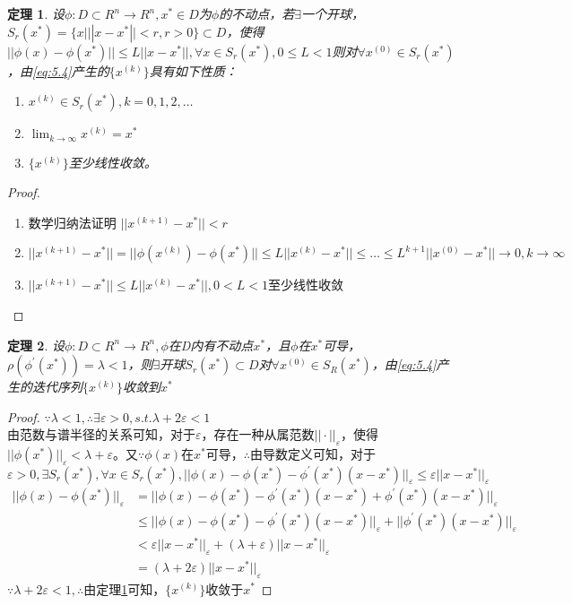 \documentclass[a4paper]{article}
\newtheorem{theorem}{定理}[section]
\begin{document}
\begin{theorem}
    \label{theorem:5.3}
    设$\phi:D\subset R^n \rightarrow R^n, x^*\in D$为$\phi$的不动点，若$\exists$一个开球，$S_r(x^*)=\{x|||x-x^*||<r, r>0\}\subset D $，使得
    $||\phi(x)-\phi(x^*) ||\le L||x-x^*||,\forall x\in S_r(x^*), 0\le L<1 $则对$\forall x^{(0)}\in S_r(x^*) $，由\ref{eq:5.4}产生的$\{x^{(k)} \}$具有如下性质：
    \begin{enumerate}
        \item $x^{(k)}\in S_r(x^*), k=0,1,2,\dots $
        \item $\lim_{k\rightarrow\infty}x^{(k)}=x^* $
        \item $\{x^{(k)} \}$至少线性收敛。
    \end{enumerate}
\end{theorem}
\begin{proof}
    \begin{enumerate}
        \item 数学归纳法证明 $||x^{(k+1)}-x^* ||<r$
        \item $||x^{(k+1)}-x^* ||=||\phi(x^{(k)})-\phi(x^*) ||\le L||x^{(k)}-x^*||\le \dots \le L^{k+1}||x^{(0)}-x^* || \rightarrow 0, k\rightarrow\infty$
        \item $||x^{(k+1)}-x^* ||\le L||x^{(k)}-x^*||, 0<L<1$至少线性收敛
    \end{enumerate}
\end{proof}

\begin{theorem}
    设$\phi:D\subset R^n \rightarrow R^n, \phi$在D内有不动点$x^*$，且$\phi$在$x^*$可导，$\rho(\phi^{'}(x^*))=\lambda <1$，则$\exists$开球$S_r(x^*)\subset D$对$\forall x^{(0)}\in S_R(x^*) $，由\ref{eq:5.4}产生的迭代序列$\{x^{(k)} \}$收敛到$x^*$
\end{theorem}
\begin{proof}
    $\because \lambda<1, \therefore \exists \varepsilon >0, s.t. \lambda+2\varepsilon<1$\\
    由范数与谱半径的关系可知，对于$\varepsilon$，存在一种从属范数$||\cdot||_\varepsilon$，使得$||\phi(x^*) ||_\varepsilon<\lambda+\varepsilon$。又$\because \phi(x)$在$x^*$可导，$\therefore $由导数定义可知，对于$\varepsilon>0, \exists S_r(x^*), \forall x\in S_r(x^*), ||\phi(x)-\phi(x^*)-\phi^{'}(x^*)(x-x^*) ||_\varepsilon\le \varepsilon||x-x^*||_\varepsilon $
    \begin{equation*}
        \begin{split}
            ||\phi(x)-\phi(x^*) ||_\varepsilon &=||\phi(x)-\phi(x^*)-\phi^{'}(x^*)(x-x^*)+\phi^{'}(x^*)(x-x^*) ||_\varepsilon\\
            &\le ||\phi(x)-\phi(x^*)-\phi^{'}(x^*)(x-x^*)||_\varepsilon+||\phi^{'}(x^*)(x-x^*) ||_\varepsilon\\
            &< \varepsilon||x-x^*||_\varepsilon + (\lambda+\varepsilon)||x-x^*||_\varepsilon\\
            &= (\lambda+2\varepsilon)||x-x^*||_\varepsilon
        \end{split}
    \end{equation*}
    $\because \lambda+2\varepsilon <1, \therefore$由定理\ref{theorem:5.3}可知，$\{x^{(k)} \}$收敛于$x^*$
\end{proof}
\end{document}
